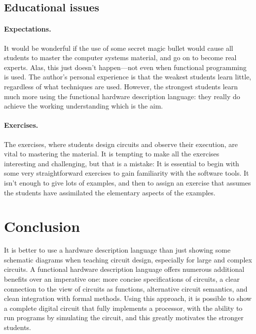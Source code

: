 \documentclass[submission,copyright,creativecommons]{eptcs}
\begin{document}
\subsection{Educational issues}

\paragraph{Expectations.}
It would be wonderful if the use of some secret magic bullet would
cause all students to master the computer systems material, and go
on to become real experts.  Alas, this just doesn't happen---not
even when functional programming is used.  The author's personal
experience is that the weakest students learn little, regardless of
what techniques are used.  However, the strongest students learn
much more using the functional hardware description language: they
really do achieve the working understanding which is the aim.

\paragraph{Exercises.}
The exercises, where students design circuits and observe their
execution, are vital to mastering the material.  It is tempting to
make all the exercises interesting and challenging, but that is a
mistake: It is essential to begin with some very straightforward
exercises to gain familiarity with the software tools.  It isn't
enough to give lots of examples, and then to assign an exercise
that assumes the students have assimilated the elementary aspects
of the examples.

\section{Conclusion}
\label{sec:conclusion}

It is better to use a hardware description language than just
showing some schematic diagrams when teaching circuit design,
especially for large and complex circuits.  A functional hardware
description language offers numerous additional benefits over an
imperative one: more concise specifications of circuits, a clear
connection to the view of circuits as functions, alternative
circuit semantics, and clean integration with formal methods.
Using this approach, it is possible to show a complete digital
circuit that fully implements a processor, with the ability to run
programs by simulating the circuit, and this greatly motivates the
stronger students.



\end{document}
